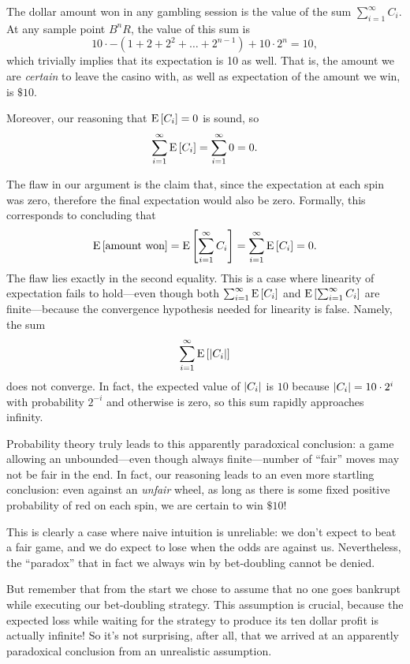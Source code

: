 \documentclass[11pt,twoside]{article}
\begin{document}
The dollar amount won in any gambling session is the value of the sum
$\sum_{i = 1}^\infty C_i$.  At any sample point $B^nR$, the value of this
sum is
\[
10 \cdot -(1 + 2 + 2^2 + \dots + 2^{n - 1}) + 10 \cdot 2^n  = 10,
\]
which trivially implies that its expectation is 10 as well.  That is, the
amount we are \emph{certain} to leave the casino with, as well as
expectation of the amount we win, is $\$10$.

Moreover, our reasoning that $\mathop{\textup{E}}\nolimits\left[C_i\right] = 0$ is sound, so 
\[
\sum_{i = 1}^\infty \mathop{\textup{E}}\nolimits\left[C_i\right] = \sum_{i = 1}^\infty 0 = 0.
\]

The flaw in our argument is the claim that, since the expectation at each
spin was zero, therefore the final expectation would also be zero.
Formally, this corresponds to concluding that
\[
\mathop{\textup{E}}\nolimits\left[\mbox{amount won}\right]  =  \mathop{\textup{E}}\nolimits\left[\sum_{i = 1}^\infty C_i\right]
  =  \sum_{i = 1}^\infty \mathop{\textup{E}}\nolimits\left[C_i\right] = 0.
\]
The flaw lies exactly in the second equality.  This is a case where
linearity of expectation fails to hold---even though both $\sum_{i =
1}^\infty \mathop{\textup{E}}\nolimits\left[C_i\right]$ and $\mathop{\textup{E}}\nolimits\left[\sum_{i = 1}^\infty C_i\right]$ are
finite---because the convergence hypothesis needed for linearity is false.
Namely, the sum
\[
\sum_{i = 1}^\infty \mathop{\textup{E}}\nolimits\left[\left|C_i\right|\right]
\]
does not converge.  In fact, the expected value of $\left|C_i\right|$ is $10$
because $\left|C_i\right| =  10 \cdot 2^{i}$  with probability $2^{-i}$ and
otherwise is zero, so this sum rapidly approaches infinity.

Probability theory truly leads to this apparently paradoxical conclusion: a
game allowing an unbounded---even though always finite---number of ``fair''
moves may not be fair in the end.  In fact, our reasoning leads to an even
more startling conclusion: even against an \emph{unfair} wheel, as long as
there is some fixed positive probability of red on each spin, we are
certain to win $\$10$!

This is clearly a case where naive intuition is unreliable: we don't
expect to beat a fair game, and we do expect to lose when the odds are
against us.  Nevertheless, the ``paradox'' that in fact we always win by
bet-doubling cannot be denied.

But remember that from the start we chose to assume that no one goes
bankrupt while executing our bet-doubling strategy.  This assumption is
crucial, because the expected loss while waiting for the strategy to
produce its ten dollar profit is actually infinite!  So it's not
surprising, after all, that we arrived at an apparently paradoxical
conclusion from an unrealistic assumption.
\end{document}
